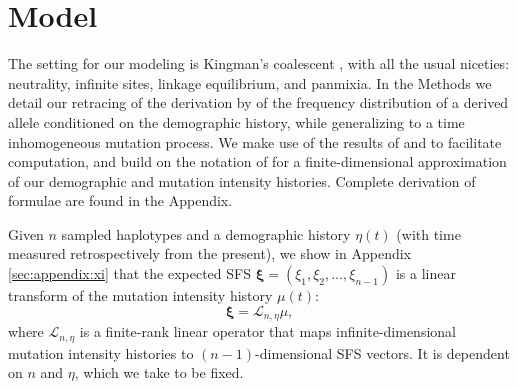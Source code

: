 \documentclass[11pt]{article}
\begin{document}

\section*{Model}\label{sec:model}

The setting for our modeling is Kingman's coalescent \citep{Kingman1982-ge, Kingman1982-tf, Kingman1982-ys, Kingman2000-jr}, with all the usual niceties: neutrality, infinite sites, linkage equilibrium, and panmixia.
In the Methods we detail our retracing of the derivation by \cite{Griffiths1998-qf} of the frequency distribution of a derived allele conditioned on the demographic history, while generalizing to a time inhomogeneous mutation process.
We make use of the results of \cite{Polanski2003-kg} and \cite{Polanski2003-ll} to facilitate computation, and build on the notation of \cite{Rosen2018-bb} for a finite-dimensional approximation of our demographic and mutation intensity histories.
Complete derivation of formulae are found in the Appendix.

Given $n$ sampled haplotypes and a demographic history $\eta(t)$ (with time measured retrospectively from the present), we show in Appendix \ref{sec:appendix:xi} that the expected SFS $\boldsymbol \xi = (\xi_1, \xi_2,\dots, \xi_{n-1})$ is a linear transform of the mutation intensity history $\mu(t)$:
\begin{equation}
  \label{eqn:transform}
\boldsymbol \xi = \mathcal{L}_{n,\eta}\mu,
\end{equation}
where $\mathcal{L}_{n,\eta}$ is a finite-rank linear operator that maps infinite-dimensional mutation intensity histories to $(n-1)$-dimensional SFS vectors.
It is dependent on $n$ and $\eta$, which we take to be fixed.

\end{document}
